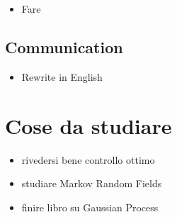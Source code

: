 \documentclass{article}
\begin{document}
\begin{itemize}%
\item Fare

\end{itemize}
\hypertarget{communication}{}\subsection*{{Communication}}\label{communication}

\begin{itemize}%
\item Rewrite in English

\end{itemize}
\hypertarget{cose_da_studiare}{}\section*{{Cose da studiare}}\label{cose_da_studiare}

\begin{itemize}%
\item rivedersi bene controllo ottimo
\item studiare Markov Random Fields
\item finire libro su Gaussian Process

\end{itemize}
\end{document}
